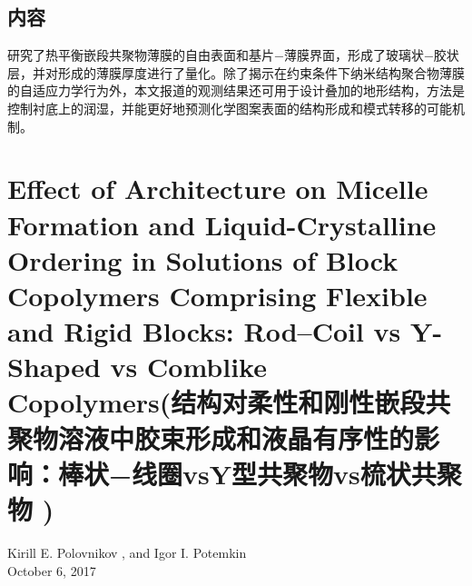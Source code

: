 \documentclass[12pt,a4paper]{article}
\numberwithin{equation}{section}
\begin{document}
\subsection{内容}
研究了热平衡嵌段共聚物薄膜的自由表面和基片−薄膜界面，形成了玻璃状−胶状层，并对形成的薄膜厚度进行了量化。除了揭示在约束条件下纳米结构聚合物薄膜的自适应力学行为外，本文报道的观测结果还可用于设计叠加的地形结构，方法是控制衬底上的润湿，并能更好地预测化学图案表面的结构形成和模式转移的可能机制。

\section{Effect of Architecture on Micelle Formation and Liquid-Crystalline Ordering in Solutions of Block Copolymers Comprising Flexible and Rigid Blocks: Rod–Coil vs Y-Shaped vs Comblike Copolymers(结构对柔性和刚性嵌段共聚物溶液中胶束形成和液晶有序性的影响：棒状−线圈vsY型共聚物vs梳状共聚物
)}
\begin{center}
Kirill E. Polovnikov , and Igor I. Potemkin\\
October 6, 2017
\end{center}
\end{document}
